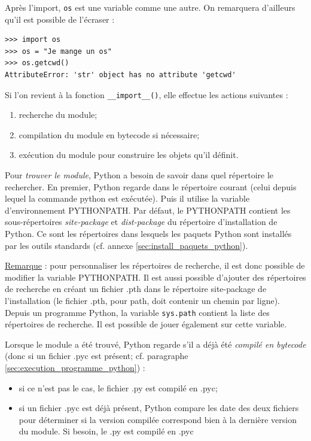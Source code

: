 \documentclass[12pt, a4paper]{article}
\begin{document}
Après l'import, \lstinline{os} est une variable comme une autre. On remarquera d'ailleurs qu'il est possible de l'écraser :
\begin{lstlisting}
>>> import os
>>> os = "Je mange un os"
>>> os.getcwd()
AttributeError: 'str' object has no attribute 'getcwd'
\end{lstlisting} 


Si l'on revient à la fonction \lstinline{__import__()}, elle effectue les actions suivantes :
\begin{enumerate}
	\item recherche du module;
	\item compilation du module en bytecode si nécessaire;
	\item exécution du module pour construire les objets qu'il définit.
\end{enumerate}

Pour \textit{trouver le module}, Python a besoin de savoir dans quel répertoire le rechercher. En premier, Python regarde dans le répertoire courant (celui depuis lequel la commande python est exécutée). Puis il utilise la variable d'environnement PYTHONPATH. Par défaut, le PYTHONPATH contient les sous-répertoires \textit{site-package} et \textit{dist-package} du répertoire d'installation de Python. Ce sont les répertoires dans lesquels les paquets Python sont installés par les outils standards (cf. annexe \ref{sec:install_paquets_python}). 

\underline{Remarque} : pour personnaliser les répertoires de recherche, il est donc possible de modifier la variable PYTHONPATH. Il est aussi possible d'ajouter des répertoires de recherche en créant un fichier .pth dans le répertoire site-package de l'installation (le fichier .pth, pour path, doit contenir un chemin par ligne). Depuis un programme Python, la variable \lstinline{sys.path} contient la liste des répertoires de recherche. Il est possible de jouer également sur cette variable.


Lorsque le module a été trouvé, Python regarde s'il a déjà été \textit{compilé en bytecode} (donc si un fichier .pyc est présent; cf. paragraphe \ref{sec:execution_programme_python}) :
\begin{itemize}
	\item si ce n'est pas le cas, le fichier .py est compilé en .pyc;
	\item si un fichier .pyc est déjà présent, Python compare les date des deux fichiers pour déterminer si la version compilée correspond bien à la dernière version du module. Si besoin, le .py est compilé en .pyc
\end{itemize}
\end{document}

